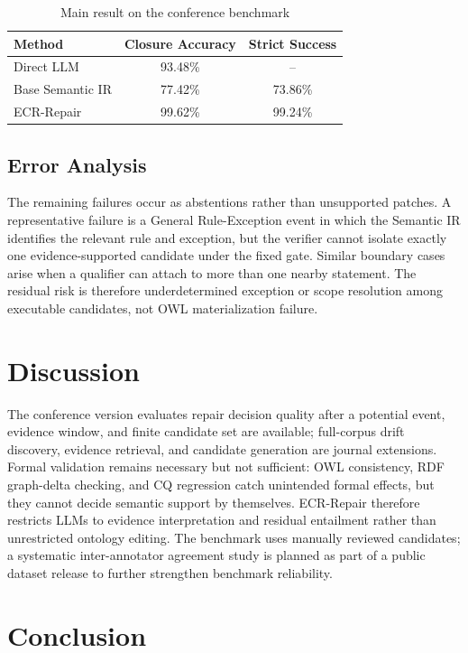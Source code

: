 \documentclass[conference]{IEEEtran}
\begin{document}
\begin{table}[t]
\centering
\caption{Main result on the conference benchmark}
\label{tab:main_result}
\begin{tabular}{lcc}
\toprule
Method & Closure Accuracy & Strict Success \\
\midrule
Direct LLM & 93.48\% & -- \\
Base Semantic IR & 77.42\% & 73.86\% \\
ECR-Repair & 99.62\% & 99.24\% \\
\bottomrule
\end{tabular}
\end{table}

\subsection{Error Analysis}

The remaining failures occur as abstentions rather than unsupported patches. A representative failure is a General Rule-Exception event in which the Semantic IR identifies the relevant rule and exception, but the verifier cannot isolate exactly one evidence-supported candidate under the fixed gate. Similar boundary cases arise when a qualifier can attach to more than one nearby statement. The residual risk is therefore underdetermined exception or scope resolution among executable candidates, not OWL materialization failure.

\section{Discussion}

The conference version evaluates repair decision quality after a potential event, evidence window, and finite candidate set are available; full-corpus drift discovery, evidence retrieval, and candidate generation are journal extensions. Formal validation remains necessary but not sufficient: OWL consistency, RDF graph-delta checking, and CQ regression catch unintended formal effects, but they cannot decide semantic support by themselves. ECR-Repair therefore restricts LLMs to evidence interpretation and residual entailment rather than unrestricted ontology editing. The benchmark uses manually reviewed candidates; a systematic inter-annotator agreement study is planned as part of a public dataset release to further strengthen benchmark reliability.

\section{Conclusion}
\end{document}
